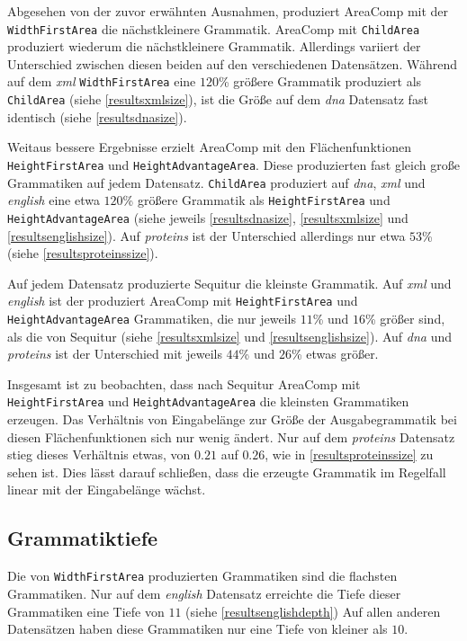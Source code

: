 Abgesehen von der zuvor erwähnten Ausnahmen, produziert AreaComp mit der\\
\texttt{WidthFirstArea} die nächstkleinere Grammatik. AreaComp mit \texttt{ChildArea} produziert wiederum die nächstkleinere Grammatik. Allerdings variiert der Unterschied zwischen diesen beiden auf den verschiedenen Datensätzen. Während auf dem \emph{xml} \texttt{WidthFirstArea} eine $120$\% größere Grammatik produziert als \texttt{ChildArea} (siehe \autoref{resultsxmlsize}), ist die Größe auf dem \emph{dna} Datensatz fast identisch (siehe \autoref{resultsdnasize}).

Weitaus bessere Ergebnisse erzielt AreaComp mit den Flächenfunktionen \\
\texttt{HeightFirstArea} und \texttt{HeightAdvantageArea}.
Diese produzierten fast gleich große Grammatiken auf jedem Datensatz. \texttt{ChildArea} produziert auf \emph{dna}, \emph{xml} und \emph{english} eine etwa $120$\% größere Grammatik als \texttt{HeightFirstArea} und \texttt{HeightAdvantageArea} (siehe jeweils \autoref{resultsdnasize}, \autoref{resultsxmlsize} und \autoref{resultsenglishsize}). Auf \emph{proteins} ist der Unterschied allerdings nur etwa $53$\% (siehe \autoref{resultsproteinssize}).

Auf jedem Datensatz produzierte Sequitur die kleinste Grammatik. Auf \emph{xml} und \emph{english} ist der produziert AreaComp mit \texttt{HeightFirstArea} und \texttt{HeightAdvantageArea} Grammatiken, die nur jeweils $11$\% und $16$\% größer sind, als die von Sequitur (siehe \autoref{resultsxmlsize} und \autoref{resultsenglishsize}).
Auf \emph{dna} und \emph{proteins} ist der Unterschied mit jeweils $44$\% und $26$\% etwas größer.

Insgesamt ist zu beobachten, dass nach Sequitur AreaComp mit \texttt{HeightFirstArea} und \texttt{HeightAdvantageArea} die kleinsten Grammatiken erzeugen. Das Verhältnis von Eingabelänge zur Größe der Ausgabegrammatik bei diesen Flächenfunktionen sich nur wenig ändert. Nur auf dem \emph{proteins} Datensatz stieg dieses Verhältnis etwas, von $0.21$ auf $0.26$, wie in \autoref{resultsproteinssize} zu sehen ist. Dies lässt darauf schließen, dass die erzeugte Grammatik im Regelfall linear mit der Eingabelänge wächst.

\subsection{Grammatiktiefe}

Die von \texttt{WidthFirstArea} produzierten Grammatiken sind die flachsten Grammatiken. Nur auf dem \emph{english} Datensatz erreichte die Tiefe dieser Grammatiken eine Tiefe von $11$ (siehe \autoref{resultsenglishdepth}) Auf allen anderen Datensätzen haben diese Grammatiken nur eine Tiefe von kleiner als $10$.

